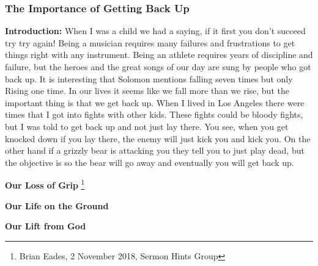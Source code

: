 


\subsubsection{The Importance of Getting Back Up}
\textbf{Introduction:} When I was a child we had a saying, if it first you don't succeed try try again!  Being a musician requires many failures and frustrations to get things right with any instrument. Being an athlete requires years of discipline and failure, but the heroes and the great songs of our day are sung by people who got back up.
It is interesting that Solomon mentions falling seven times but only Rising one time. In our lives it seems like we fall more than we rise, but the important thing is that we get back up. When I lived in Los Angeles there were times that I got into fights with other kids. These fights could be bloody fights, but I was told to get back up and not just lay there. You see, when you get knocked down if you lay there, the enemy will just kick you and kick you. On the other hand if a grizzly bear is attacking you they tell you to just play dead, but the objective is so the bear will go away and eventually you will get back up.\\
\begin{compactenum}[I.][5]
    \item \textbf{Our Loss of Grip} \footnote{Brian Eades, 2 November 2018, Sermon Hints Group}
    \item \textbf{Our Life on the Ground} 
    \item \textbf{Our Lift from God}
\end{compactenum}


    
    
